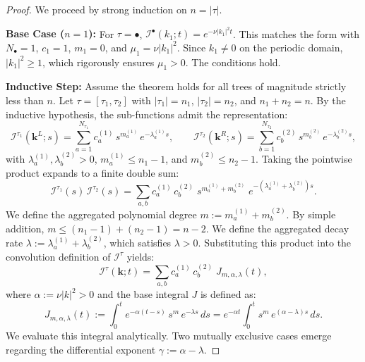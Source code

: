\documentclass[12pt,a4paper]{article}
\theoremstyle{plain}
\theoremstyle{definition}
\theoremstyle{remark}
\newcommand{\II}{\mathcal{I}}
\begin{document}
\begin{proof}
We proceed by strong induction on $n = |\tau|$.

\noindent\textbf{Base Case ($n=1$):} For $\tau = \bullet$, $\II^\bullet(k_1;t) = e^{-\nu|k_1|^2 t}$. This matches the form with $N_\bullet=1$, $c_1=1$, $m_1=0$, and $\mu_1=\nu|k_1|^2$. Since $k_1 \neq 0$ on the periodic domain, $|k_1|^2 \ge 1$, which rigorously ensures $\mu_1 > 0$. The conditions hold.

\noindent\textbf{Inductive Step:} Assume the theorem holds for all trees of magnitude strictly less than $n$. Let $\tau = [\tau_1,\tau_2]$ with $|\tau_1|=n_1$, $|\tau_2|=n_2$, and $n_1+n_2=n$. By the inductive hypothesis, the sub-functions admit the representation:
\[
  \II^{\tau_1}(\mathbf{k}^L;s) = \sum_{a=1}^{N_{\tau_1}} c_a^{(1)}\,s^{m_a^{(1)}}\,e^{-\lambda_a^{(1)} s}, \qquad \II^{\tau_2}(\mathbf{k}^R;s) = \sum_{b=1}^{N_{\tau_2}} c_b^{(2)}\,s^{m_b^{(2)}}\,e^{-\lambda_b^{(2)} s},
\]
with $\lambda_a^{(1)}, \lambda_b^{(2)} > 0$, $m_a^{(1)} \le n_1 - 1$, and $m_b^{(2)} \le n_2 - 1$. Taking the pointwise product expands to a finite double sum:
\[
  \II^{\tau_1}(s)\,\II^{\tau_2}(s) = \sum_{a,b} c_a^{(1)}\,c_b^{(2)}\; s^{m_a^{(1)}+m_b^{(2)}}\;e^{-(\lambda_a^{(1)}+\lambda_b^{(2)})s}.
\]
We define the aggregated polynomial degree $m := m_a^{(1)}+m_b^{(2)}$. By simple addition, $m \le (n_1-1)+(n_2-1) = n-2$. We define the aggregated decay rate $\lambda := \lambda_a^{(1)}+\lambda_b^{(2)}$, which satisfies $\lambda > 0$. 
Substituting this product into the convolution definition of $\II^\tau$ yields:
\[
  \II^\tau(\mathbf{k};t) = \sum_{a,b} c_a^{(1)}\,c_b^{(2)}\;J_{m,\alpha,\lambda}(t),
\]
where $\alpha := \nu|k|^2 > 0$ and the base integral $J$ is defined as:
\[
  J_{m,\alpha,\lambda}(t) := \int_0^t e^{-\alpha(t-s)}\,s^m\,e^{-\lambda s}\,ds = e^{-\alpha t}\int_0^t s^m\,e^{(\alpha-\lambda)s}\,ds.
\]
We evaluate this integral analytically. Two mutually exclusive cases emerge regarding the differential exponent $\gamma := \alpha - \lambda$.


\end{proof}
\end{document}
